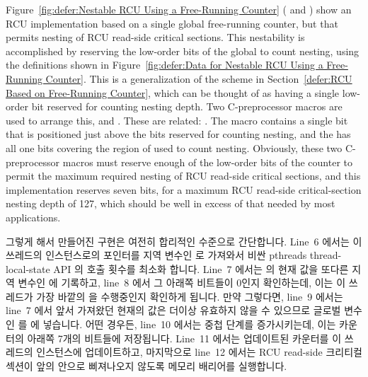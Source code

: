 Figure~\ref{fig:defer:Nestable RCU Using a Free-Running Counter}
( and )
show an RCU implementation based on a single global free-running counter,
but that permits nesting of RCU read-side critical sections.
This nestability is accomplished by reserving the low-order bits of the
global  to count nesting, using the definitions shown in
Figure~\ref{fig:defer:Data for Nestable RCU Using a Free-Running Counter}.
This is a generalization of the scheme in
Section~\ref{defer:RCU Based on Free-Running Counter},
which can be thought of as having a single low-order bit reserved
for counting nesting depth.
Two C-preprocessor macros are used to arrange this,
 and
.
These are related: .
The  macro contains a single bit that is
positioned just above the bits reserved for counting nesting,
and the  has all one bits covering the
region of  used to count nesting.
Obviously, these two C-preprocessor macros must reserve enough
of the low-order bits of the counter to permit the maximum required
nesting of RCU read-side critical sections, and this implementation
reserves seven bits, for a maximum RCU read-side critical-section
nesting depth of 127, which should be well in excess of that needed
by most applications.
\fi

그렇게 해서 만들어진  구현은 여전히 합리적인 수준으로
간단합니다.
Line~6 에서는 이 쓰레드의  인스턴스로의 포인터를 지역 변수인
 로 가져와서 비싼 pthreads thread-local-state API 의 호출 횟수를
최소화 합니다.
Line~7 에서는  의 현재 값을 또다른 지역 변수인  에
기록하고, line~8 에서 그 아래쪽 비트들이 0인지 확인하는데, 이는 이 쓰레드가
가장 바깥의  을 수행중인지 확인하게 됩니다.
만약 그렇다면, line~9 에서는 line~7 에서 앞서 가져왔던 현재의 값은 더이상
유효하지 않을 수 있으므로 글로벌 변수인  를  에
넣습니다.
어떤 경우든, line~10 에서는 중첩 단계를 증가시키는데, 이는 카운터의 아래쪽
7개의 비트들에 저장됩니다.
Line~11 에서는 업데이트된 카운터를 이 쓰레드의  인스턴스에
업데이트하고, 마지막으로 line~12 에서는 RCU read-side 크리티컬 섹션이 앞의
 안으로 삐져나오지 않도록 메모리 배리어를 실행합니다.
\iffalse

